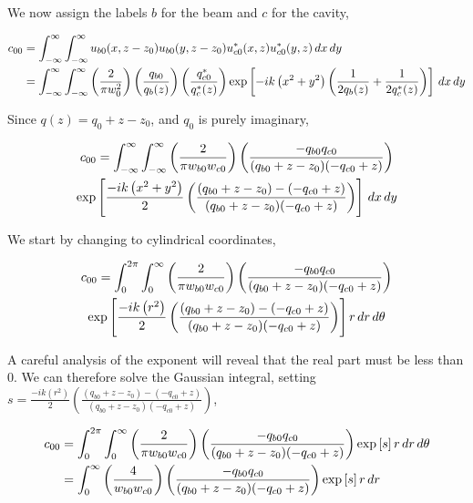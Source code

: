 We now assign the labels $b$ for the beam and $c$ for the cavity,

\begin{align}
    c_{00} &= \int^{\infty}_{- \infty} \int^{\infty}_{- \infty} 
    u_{b0}(x,z-z_0)u_{b0}(y,z-z_0) u_{c0}^*(x,z)u_{c0}^*(y,z) \,dx \,dy \nonumber
\\  &= \int^{\infty}_{- \infty} \int^{\infty}_{- \infty}  \left( \frac{2}{\pi w^2_0} \right) \left( \frac{q_{b0}}{q_{b}(z)} \right)
    \left( \frac{q^*_{c0}}{q^*_{c}(z)} \right) \exp \left[-ik \left( x^2 + y^2  \right)
    \left( \frac{1}{2q_b(z)} + \frac{1}{2q^*_c(z)} \right) \right] \,dx \,dy
\end{align}

Since $q(z) = q_0 + z - z_0$, and $q_0$ is purely imaginary,


\begin{multline}
    c_{00} = \int^{\infty}_{- \infty} \int^{\infty}_{- \infty}  \left( \frac{2}{\pi w_{b0} w_{c0}} \right)
    \left( \frac{- q_{b0} q_{c0}}{(q_{b0}+z-z_0)(-q_{c0}+z)} \right) \\
    \exp \left[
    \frac{-ik \left( x^2 + y^2  \right)}{2} \left( \frac{(q_{b0}+z-z_0)-(-q_{c0}+z)}{(q_{b0}+z-z_0)(-q_{c0}+z)} \right)
    \right] \,dx \,dy
\end{multline}

We start by changing to cylindrical coordinates,

\begin{multline}
    c_{00} = \int^{2 \pi}_{0} \int^{\infty}_{0}  \left( \frac{2}{\pi w_{b0} w_{c0}} \right)
    \left( \frac{- q_{b0} q_{c0}}{(q_{b0}+z-z_0)(-q_{c0}+z)} \right) \\
    \exp \left[
    \frac{-ik \left( r^2  \right)}{2} \left( \frac{(q_{b0}+z-z_0)-(-q_{c0}+z)}{(q_{b0}+z-z_0)(-q_{c0}+z)} \right)
    \right] r \,dr \,d\theta
\end{multline}

A careful analysis of the exponent will reveal that the real part must be less than $0$.
We can therefore solve the Gaussian integral, setting $s =
\frac{-ik \left( r^2  \right)}{2} \left( \frac{(q_{b0}+z-z_0)-(-q_{c0}+z)}{(q_{b0}+z-z_0)(-q_{c0}+z)} \right)
$,

\begin{align}
    c_{00} &= \int^{2 \pi}_{0} \int^{\infty}_{0}  \left( \frac{2}{\pi w_{b0} w_{c0}} \right)
    \left( \frac{- q_{b0} q_{c0}}{(q_{b0}+z-z_0)(-q_{c0}+z)} \right)
    \exp \left[ s
    \right] r \,dr \,d\theta \nonumber
\\  &= \int^{\infty}_{0} \left( \frac{4}{w_{b0} w_{c0}} \right)
    \left( \frac{- q_{b0} q_{c0}}{(q_{b0}+z-z_0)(-q_{c0}+z)} \right)
    \exp \left[ s
    \right] r \,dr
\end{align}

